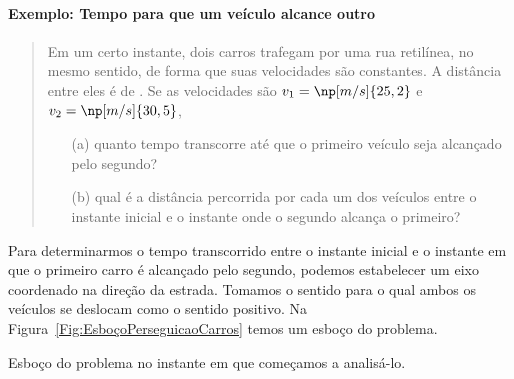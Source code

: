 \paragraph{Exemplo: Tempo para que um veículo alcance outro}

\begin{quote}
	Em um certo instante, dois carros trafegam por uma rua retilínea, no mesmo sentido, de forma que suas velocidades são constantes. A distância entre eles é de . Se as velocidades são $v_1 = \np[m/s]{25,2}$ e $v_2 = \np[m/s]{30,5}$,
	\begin{itemize}
		\item[(a)] quanto tempo transcorre até que o primeiro veículo seja alcançado pelo segundo?
		\item[(b)] qual é a distância percorrida por cada um dos veículos entre o instante inicial e o instante onde o segundo alcança o primeiro?
	\end{itemize}
\end{quote}

Para determinarmos o tempo transcorrido entre o instante inicial e o instante em que o primeiro carro é alcançado pelo segundo, podemos estabelecer um eixo coordenado na direção da estrada. Tomamos o sentido para o qual ambos os veículos se deslocam como o sentido positivo. Na Figura~\ref{Fig:EsboçoPerseguicaoCarros} temos um esboço do problema.

\begin{marginfigure}
\centering
{}
\caption{Esboço do problema no instante em que começamos a analisá-lo. \label{Fig:EsboçoPerseguicaoCarros}}
\end{marginfigure}

